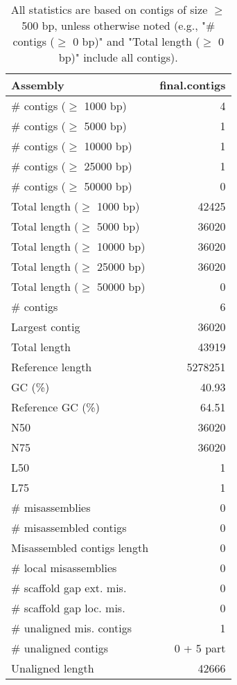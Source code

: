 \documentclass[12pt,a4paper]{article}
\begin{document}
\begin{table}[ht]
\begin{center}
\caption{All statistics are based on contigs of size $\geq$ 500 bp, unless otherwise noted (e.g., "\# contigs ($\geq$ 0 bp)" and "Total length ($\geq$ 0 bp)" include all contigs).}
\begin{tabular}{|l*{1}{|r}|}
\hline
Assembly & final.contigs \\ \hline
\# contigs ($\geq$ 1000 bp) & 4 \\ \hline
\# contigs ($\geq$ 5000 bp) & 1 \\ \hline
\# contigs ($\geq$ 10000 bp) & 1 \\ \hline
\# contigs ($\geq$ 25000 bp) & 1 \\ \hline
\# contigs ($\geq$ 50000 bp) & 0 \\ \hline
Total length ($\geq$ 1000 bp) & 42425 \\ \hline
Total length ($\geq$ 5000 bp) & 36020 \\ \hline
Total length ($\geq$ 10000 bp) & 36020 \\ \hline
Total length ($\geq$ 25000 bp) & 36020 \\ \hline
Total length ($\geq$ 50000 bp) & 0 \\ \hline
\# contigs & 6 \\ \hline
Largest contig & 36020 \\ \hline
Total length & 43919 \\ \hline
Reference length & 5278251 \\ \hline
GC (\%) & 40.93 \\ \hline
Reference GC (\%) & 64.51 \\ \hline
N50 & 36020 \\ \hline
N75 & 36020 \\ \hline
L50 & 1 \\ \hline
L75 & 1 \\ \hline
\# misassemblies & 0 \\ \hline
\# misassembled contigs & 0 \\ \hline
Misassembled contigs length & 0 \\ \hline
\# local misassemblies & 0 \\ \hline
\# scaffold gap ext. mis. & 0 \\ \hline
\# scaffold gap loc. mis. & 0 \\ \hline
\# unaligned mis. contigs & 1 \\ \hline
\# unaligned contigs & 0 + 5 part \\ \hline
Unaligned length & 42666 \\ \hline

\end{tabular}
\end{center}
\end{table}
\end{document}
